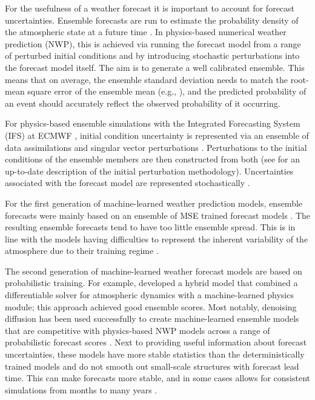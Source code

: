 \documentclass{article}
\begin{document}
For the usefulness of a weather forecast it is important to account for forecast uncertainties. Ensemble forecasts are run to estimate the probability density of the atmospheric state at a future time \citep{lewis2005,leutbecher2008ensemble}. In physics-based numerical weather prediction (NWP), this is achieved via running the forecast model from a range of perturbed initial conditions and by introducing stochastic perturbations into the forecast model itself. The aim is to generate a well calibrated ensemble. This means that on average, the ensemble standard deviation needs to match the root-mean square error of the ensemble mean (e.g., \cite{fortin2014}), and the predicted probability of an event should accurately reflect the observed probability of it occurring.

For physics-based ensemble simulations with the Integrated Forecasting System (IFS) at ECMWF \citep{molteni1996ecmwf}, initial condition uncertainty is represented via an ensemble of data assimilations \citep{doi:10.1002/qj.346, isaksen2010eda, lang2019eda} and singular vector perturbations \citep{leutbecher2008ensemble}. Perturbations to the initial conditions of the ensemble members are then constructed from both (see \cite{lang2021more} for an up-to-date description of the initial perturbation methodology). Uncertainties associated with the forecast model are represented stochastically \citep{leutbecher2017, berner.ea.2017}.

For the first generation of machine-learned weather prediction models, ensemble forecasts were mainly based on an ensemble of MSE trained forecast models \citep{bihlo2021generative,scher2021ensemble, clare2021combining, pathak2022fourcastnet, pangu2023, weyn2024ensemble}. The resulting ensemble forecasts tend to have too little ensemble spread. This is in line with the models having difficulties to represent the inherent variability of the atmosphere due to their training regime \citep{blogaifs2}.

The second generation of machine-learned weather forecast models are based on probabilistic training. For example, \cite{kochkov2024neural} developed a hybrid model that combined a differentiable solver for atmospheric dynamics with a machine-learned physics module; this approach achieved good ensemble scores. Most notably, denoising diffusion \citep{DBLP:journals/corr/Sohl-DicksteinW15, karras2022elucidating} has been used successfully to create machine-learned ensemble models that are competitive with physics-based NWP models across a range of probabilistic forecast scores \citep{price2023gencast,ensemble_blog,aifsensemblesNL2024}. Next to providing useful information about forecast uncertainties, these models have more stable statistics than the deterministically trained models and do not smooth out small-scale structures with forecast lead time. This can make forecasts more stable, and in some cases allows for consistent simulations from months \citep{aifsensemblesNL2024} to many years \citep{kochkov2024neural}.
\end{document}
